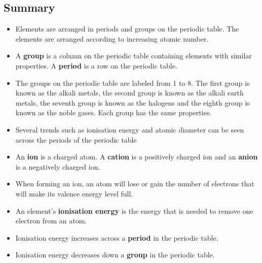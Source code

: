             \subsection{ Summary}
            \nopagebreak
            \label{m38757*uid0123}\begin{itemize}[noitemsep]
            \label{m38757*id79342}\item Elements are arranged in periods and groups on the periodic table. The elements are arranged according to increasing atomic number. 
\label{m38757*id97342}\item A \textbf{group} is a column on the periodic table containing elements with similar properties. A \textbf{period} is a row on the periodic table.
\item The groups on the periodic table are labeled from 1 to 8. The first group is known as the alkali metals, the second group is known as the alkali earth metals, the seventh group is known as the halogens and the eighth group is known as the noble gases. Each group has the same properties.\item Several trends such as ionisation energy and atomic diameter can be seen across the periods of the periodic table\label{m38757*uid184}\item An \textbf{ion} is a charged atom. A \textbf{cation} is a positively charged ion and an \textbf{anion} is a negatively charged ion.
\label{m38757*uid185}\item When forming an ion, an atom will lose or gain the number of electrons that will make its valence energy level full.
\label{m38757*uid186}\item An element's \textbf{ionisation energy} is the energy that is needed to remove one electron from an atom.
\label{m38757*uid187}\item Ionisation energy increases across a \textbf{period} in the periodic table.
\label{m38757*uid188}\item Ionisation energy decreases down a \textbf{group} in the periodic table.
\end{itemize}
        \label{m38757*eip-219}
